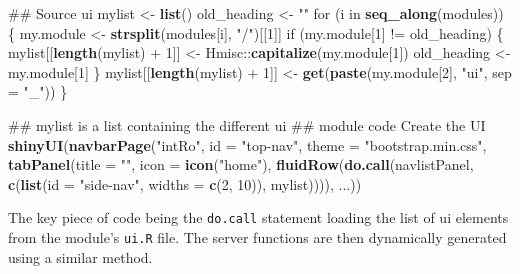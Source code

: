 \documentclass[12pt,]{article}
\newenvironment{Shaded}{\begin{snugshade}}{\end{snugshade}}
\newcommand{\KeywordTok}[1]{\textcolor[rgb]{0.13,0.29,0.53}{\textbf{{#1}}}}
\newcommand{\DataTypeTok}[1]{\textcolor[rgb]{0.13,0.29,0.53}{{#1}}}
\newcommand{\DecValTok}[1]{\textcolor[rgb]{0.00,0.00,0.81}{{#1}}}
\newcommand{\StringTok}[1]{\textcolor[rgb]{0.31,0.60,0.02}{{#1}}}
\newcommand{\NormalTok}[1]{{#1}}
\begin{document}
\begin{Shaded}
\begin{Highlighting}[]
\NormalTok{## Source ui}
\NormalTok{mylist <-}\StringTok{ }\KeywordTok{list}\NormalTok{()}
\NormalTok{old_heading <-}\StringTok{ ""}
\NormalTok{for (i in }\KeywordTok{seq_along}\NormalTok{(modules)) \{}
    \NormalTok{my.module <-}\StringTok{ }\KeywordTok{strsplit}\NormalTok{(modules[i], }\StringTok{"/"}\NormalTok{)[[}\DecValTok{1}\NormalTok{]]}
    \NormalTok{if (my.module[}\DecValTok{1}\NormalTok{] !=}\StringTok{ }\NormalTok{old_heading) \{}
        \NormalTok{mylist[[}\KeywordTok{length}\NormalTok{(mylist) +}\StringTok{ }\DecValTok{1}\NormalTok{]] <-}\StringTok{ }\NormalTok{Hmisc::}\KeywordTok{capitalize}\NormalTok{(my.module[}\DecValTok{1}\NormalTok{])}
        \NormalTok{old_heading <-}\StringTok{ }\NormalTok{my.module[}\DecValTok{1}\NormalTok{]}
    \NormalTok{\}}
    \NormalTok{mylist[[}\KeywordTok{length}\NormalTok{(mylist) +}\StringTok{ }\DecValTok{1}\NormalTok{]] <-}\StringTok{ }\KeywordTok{get}\NormalTok{(}\KeywordTok{paste}\NormalTok{(my.module[}\DecValTok{2}\NormalTok{], }
        \StringTok{"ui"}\NormalTok{, }\DataTypeTok{sep =} \StringTok{"_"}\NormalTok{))}
\NormalTok{\}}

\NormalTok{## mylist is a list containing the different ui}
\NormalTok{## module code Create the UI}
\KeywordTok{shinyUI}\NormalTok{(}\KeywordTok{navbarPage}\NormalTok{(}\StringTok{"intRo"}\NormalTok{, }\DataTypeTok{id =} \StringTok{"top-nav"}\NormalTok{, }\DataTypeTok{theme =} \StringTok{"bootstrap.min.css"}\NormalTok{, }
    \KeywordTok{tabPanel}\NormalTok{(}\DataTypeTok{title =} \StringTok{""}\NormalTok{, }\DataTypeTok{icon =} \KeywordTok{icon}\NormalTok{(}\StringTok{"home"}\NormalTok{), }\KeywordTok{fluidRow}\NormalTok{(}\KeywordTok{do.call}\NormalTok{(navlistPanel, }
        \KeywordTok{c}\NormalTok{(}\KeywordTok{list}\NormalTok{(}\DataTypeTok{id =} \StringTok{"side-nav"}\NormalTok{, }\DataTypeTok{widths =} \KeywordTok{c}\NormalTok{(}\DecValTok{2}\NormalTok{, }\DecValTok{10}\NormalTok{)), }
            \NormalTok{mylist)))), ...))}
\end{Highlighting}
\end{Shaded}

\normalsize

The key piece of code being the \texttt{do.call} statement loading the
list of ui elements from the module's \texttt{ui.R} file. The server
functions are then dynamically generated using a similar method.

\footnotesize
\end{document}

